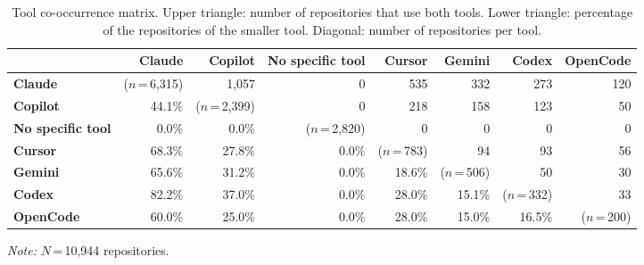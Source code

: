 \begin{table}[t]
\centering
\small
\caption{Tool co-occurrence matrix. Upper triangle: number of repositories that use both tools. Lower triangle: percentage of the repositories of the smaller tool. Diagonal: number of repositories per tool.}
\label{tab:tool-cooccurrence}
\begin{tabular}{lrrrrrrr}
\toprule
 & \textbf{Claude} & \textbf{Copilot} & \textbf{No specific tool} & \textbf{Cursor} & \textbf{Gemini} & \textbf{Codex} & \textbf{OpenCode} \\
\midrule
\textbf{Claude} & ($n$\,=\,6,315) & 1,057 & 0 & 535 & 332 & 273 & 120 \\
\textbf{Copilot} & 44.1\% & ($n$\,=\,2,399) & 0 & 218 & 158 & 123 & 50 \\
\textbf{No specific tool} & 0.0\% & 0.0\% & ($n$\,=\,2,820) & 0 & 0 & 0 & 0 \\
\textbf{Cursor} & 68.3\% & 27.8\% & 0.0\% & ($n$\,=\,783) & 94 & 93 & 56 \\
\textbf{Gemini} & 65.6\% & 31.2\% & 0.0\% & 18.6\% & ($n$\,=\,506) & 50 & 30 \\
\textbf{Codex} & 82.2\% & 37.0\% & 0.0\% & 28.0\% & 15.1\% & ($n$\,=\,332) & 33 \\
\textbf{OpenCode} & 60.0\% & 25.0\% & 0.0\% & 28.0\% & 15.0\% & 16.5\% & ($n$\,=\,200) \\
\bottomrule
\end{tabular}
\vspace{2pt}
\begin{minipage}{\columnwidth}
\centering
\footnotesize
\textit{Note:} $N$\,=\,10,944 repositories.
\end{minipage}
\end{table}
